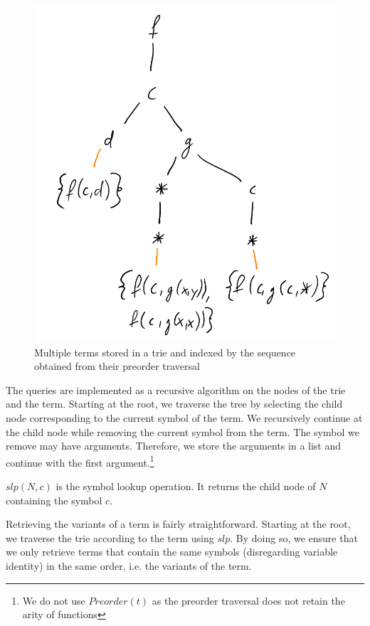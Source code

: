 \begin{figure}[h]
\centering
\includegraphics[scale=0.25]{figures/disc_net.png}
\caption{Multiple terms stored in a trie and indexed by the sequence obtained from their preorder traversal}
\label{discnet}
\end{figure}

The queries are implemented as a recursive algorithm on the nodes of the trie and the term. Starting at the root, we traverse the tree by selecting the child node corresponding to the current symbol of the term. We recursively continue at the child node while removing the current symbol from the term. The symbol we remove may have arguments. Therefore, we store the arguments in a list and continue with the first argument.\footnote{We do not use $Preorder(t)$ as the preorder traversal does not retain the arity of functions}

\begin{defn}
  $slp(N,c)$ is the symbol lookup operation. It returns the child node of $N$ containing the symbol $c$.
\end{defn}

Retrieving the variants of a term is fairly straightforward. Starting at the root, we traverse the trie according to the term using $slp$. By doing so, we ensure that we only retrieve terms that contain the same symbols (disregarding variable identity) in the same order, i.e. the variants of the term.

